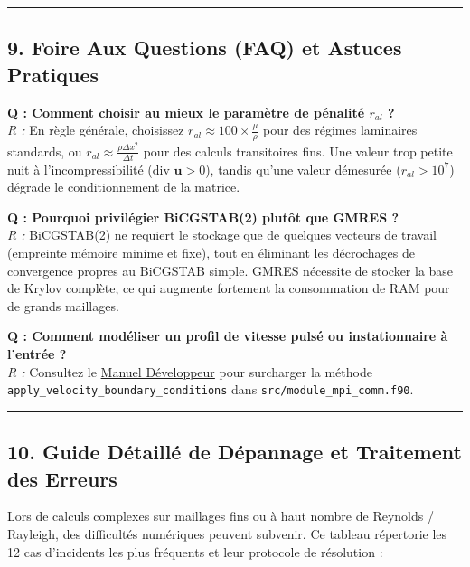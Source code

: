 \documentclass[
  french,
]{article}
\begin{document}
\begin{center}\rule{0.5\linewidth}{0.5pt}\end{center}

\subsection{9. Foire Aux Questions (FAQ) et Astuces
Pratiques}\label{foire-aux-questions-faq-et-astuces-pratiques}

\textbf{Q : Comment choisir au mieux le paramètre de pénalité \(r_{al}\)
?}\\
\emph{R :} En règle générale, choisissez
\(r_{al} \approx 100 \times \frac{\mu}{\rho}\) pour des régimes
laminaires standards, ou
\(r_{al} \approx \frac{\rho \Delta x^2}{\Delta t}\) pour des calculs
transitoires fins. Une valeur trop petite nuit à l'incompressibilité
(\(\text{div } \mathbf{u} > 0\)), tandis qu'une valeur démesurée
(\(r_{al} > 10^7\)) dégrade le conditionnement de la matrice.

\textbf{Q : Pourquoi privilégier BiCGSTAB(2) plutôt que GMRES ?}\\
\emph{R :} BiCGSTAB(2) ne requiert le stockage que de quelques vecteurs
de travail (empreinte mémoire minime et fixe), tout en éliminant les
décrochages de convergence propres au BiCGSTAB simple. GMRES nécessite
de stocker la base de Krylov complète, ce qui augmente fortement la
consommation de RAM pour de grands maillages.

\textbf{Q : Comment modéliser un profil de vitesse pulsé ou
instationnaire à l'entrée ?}\\
\emph{R :} Consultez le
\href{file:///Users/elhadjiibrahimathiam/Documents/PROJET_ANTIGRAVITY/COVOF_2D-FORTRAN/docs/DEVELOPER_GUIDE.md}{Manuel
Développeur} pour surcharger la méthode
\texttt{apply\_velocity\_boundary\_conditions} dans
\texttt{src/module\_mpi\_comm.f90}.

\begin{center}\rule{0.5\linewidth}{0.5pt}\end{center}

\subsection{10. Guide Détaillé de Dépannage et Traitement des
Erreurs}\label{guide-duxe9tailluxe9-de-duxe9pannage-et-traitement-des-erreurs}

Lors de calculs complexes sur maillages fins ou à haut nombre de
Reynolds / Rayleigh, des difficultés numériques peuvent subvenir. Ce
tableau répertorie les 12 cas d'incidents les plus fréquents et leur
protocole de résolution :
\end{document}
